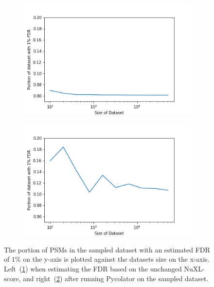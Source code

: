 \begin{figure}
	\normalsize
	\centering
	\begin{subfigure}{0.49 \textwidth}
		\includegraphics[width = \textwidth]{figures/ratio_idents_whole_df_NuXL.png}
		\caption{}
		\label{fig:results:small_dataset_first_ratio_dxl}
	\end{subfigure}
	\hfill
	\begin{subfigure}{0.49 \textwidth}
		\includegraphics[width = \textwidth]{figures/ratio_idents_whole_df_percolator.png}
		\caption{}
		\label{fig:results:small_dataset_first_auc_ratio_pxl}
	\end{subfigure}
	\caption[Portion of high-confidence PSMs in different dataset sizes]{The portion of PSMs in the sampled dataset with an estimated FDR of $1\%$ on the y-axis is plotted against the datasets size on the x-axis. Left~(\ref{fig:results:small_dataset_first_ratio_dxl}) when estimating the FDR based on the unchanged NuXL-score, and right~(\ref{fig:results:small_dataset_first_auc_ratio_pxl}) after running Pycolator on the sampled dataset.}
	\label{fig:results:small_dataset_first_auc_ratio}
\end{figure}

